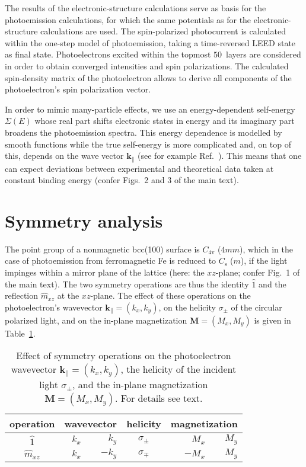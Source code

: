 \documentclass[amsfonts, amssymb, amsmath, preprint, showkeys, nofootinbib, twoside, prl]{revtex4-2}
\renewcommand{\vec}[1]{\boldsymbol{#1}}
\begin{document}
The results of the electronic-structure calculations serve as basis for the photoemission calculations, for which the same potentials as for the electronic-structure calculations are used. The spin-polarized photocurrent is calculated within the one-step model of photoemission, taking a time-reversed LEED state as final state. Photoelectrons excited within the topmost $50$~layers are considered in order to obtain converged intensities and spin polarizations. The calculated spin-density matrix of the photoelectron allows to derive all components of the photoelectron's spin polarization vector. 

In order to mimic many-particle effects, we use an energy-dependent self-energy $\Sigma(E)$ whose real part shifts electronic states in energy and its imaginary part broadens the photoemission spectra. This energy dependence is modelled by smooth functions while the true self-energy is more complicated and, on top of this, depends on the wave vector $\vec{k}_{\parallel}$ (see for example Ref.~). This means that one can expect deviations between experimental and theoretical data taken at constant binding energy (confer Figs.~2 and 3 of the main text).

\section{Symmetry analysis}
The point group of a nonmagnetic bcc(100) surface is $C_{4\mathrm{v}}$ ($4mm$), which in the case of photoemission from ferromagnetic Fe is reduced to $C_{\mathrm{s}}$ ($m$), if the light impinges within a mirror plane of the lattice (here: the $xz$-plane; confer Fig.~1 of the main text). The two symmetry operations are thus the identity $\hat{1}$ and the reflection $\hat{m}_{xz}$ at the $xz$-plane. The effect of these operations on the photoelectron's wavevector $\vec{k}_{\parallel} = (k_{x}, k_{y})$, on the helicity $\sigma_{\pm}$ of the circular polarized light, and on the in-plane magnetization $\vec{M} = (M_{x}, M_{y})$ is given in Table~\ref{tab:symmetry}.

\begin{table}
    \centering
    \caption{Effect of symmetry operations on the photoelectron wavevector $\vec{k}_{\parallel} = (k_{x}, k_{y})$, the helicity of the incident light $\sigma_{\pm}$, and the in-plane magnetization $\vec{M} = (M_{x}, M_{y})$. For details see text.}
    \label{tab:symmetry}
    \begin{tabular}{c|rrcrr}
     \hline \hline
        \multicolumn{1}{c|}{operation} & 
        \multicolumn{2}{c}{wavevector} & 
        \multicolumn{1}{c}{helicity} &  
        \multicolumn{2}{c}{magnetization} \\ \hline
        $\hat{1}$      & $k_{x}$ & $k_{y}$  & $\sigma_{\pm}$ & $M_{x}$ & $M_{y}$ \\
        $\hat{m}_{xz}$ & $k_{x}$ & $-k_{y}$ & $\sigma_{\mp}$ &  $-M_{x}$ & $M_{y}$ \\
     \hline \hline
    \end{tabular}
\end{table}
\end{document}
